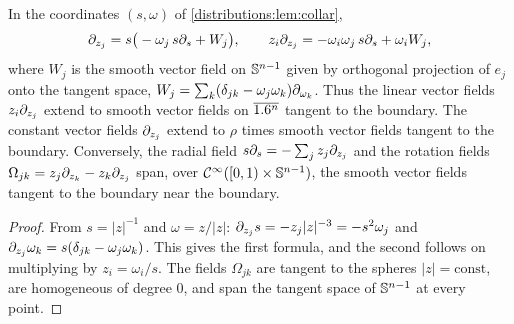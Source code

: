 \begin{lemma}\label{distributions:lem:vf}
In the coordinates $(s,\omega)$ of \cref{distributions:lem:collar},
\[
  \partial_{z_j}=s\big(-\omega_j\,s\partial_s+W_j\big),\qquad
  z_i\partial_{z_j}=-\omega_i\omega_j\,s\partial_s+\omega_iW_j,
\]
where $W_j$ is the smooth vector field on $\mathbb{S}^{n-1}$ given by orthogonal projection
of $e_j$ onto the tangent space, $W_j=\sum_k(\delta_{jk}-\omega_j\omega_k)\partial_{\omega_k}$.
Thus the linear vector fields $z_i\partial_{z_j}$ extend to smooth vector fields on
$\overline{1.6^n}$ tangent to the boundary. The constant vector fields $\partial_{z_j}$ extend to
$\rho$ times smooth vector fields tangent to the boundary. Conversely, the radial
field $s\partial_s=-\sum_jz_j\partial_{z_j}$ and the rotation fields
$\Omega_{jk}=z_j\partial_{z_k}-z_k\partial_{z_j}$ span, over $\mathcal{C}^\infty([0,1)\times\mathbb{S}^{n-1})$, the
smooth vector fields tangent to the boundary near the boundary.
\end{lemma}
\begin{proof}
From $s=|z|^{-1}$ and $\omega=z/|z|$: $\partial_{z_j}s=-z_j|z|^{-3}=-s^2\omega_j$ and
$\partial_{z_j}\omega_k=s(\delta_{jk}-\omega_j\omega_k)$. This gives the first formula, and
the second follows on multiplying by $z_i=\omega_i/s$. The fields $\Omega_{jk}$ are
tangent to the spheres $|z|=\text{const}$, are homogeneous of degree $0$, and span the
tangent space of $\mathbb{S}^{n-1}$ at every point.
\end{proof}

